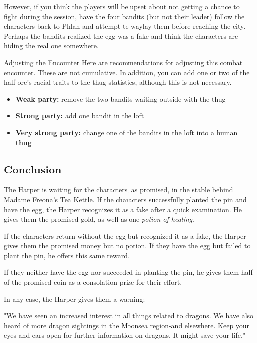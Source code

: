\documentclass[10pt,a4paper,twoside,bg=print,twocolumn,openany,nodeprecatedcode]{dndbook}
\begin{document}
However, if you think the players will be upset about not getting a chance to fight during the session, have the four bandits (but not their leader) follow the characters back to Phlan and attempt to waylay them before reaching the city. Perhaps the bandits realized the egg was a fake and think the characters are hiding the real one somewhere.

\begin{DndSidebar}[float=!b]{Adjusting the Encounter}
Here are recommendations for adjusting this combat encounter. These are not cumulative. In addition, you can add  one or two of the half-orc's racial traits to the thug statistics, although this is not necessary.




\begin{itemize}
\item \textbf{Weak party:} remove the two bandits waiting outside with the thug
\item \textbf{Strong party:} add one bandit in the loft
\item \textbf{Very strong party:} change one of the bandits in the loft into a human \textbf{thug}
\end{itemize}



\end{DndSidebar}

\subsection{Conclusion}
The Harper is waiting for the characters, as promised, in the stable behind Madame Freona's Tea Kettle. If the characters successfully planted the pin and have the egg, the Harper recognizes it as a fake after a quick examination. He gives them the promised gold, as well as one \textit{potion of healing}.

If the characters return without the egg but recognized it as a fake, the Harper gives them the promised money but no potion. If they have the egg but failed to plant the pin, he offers this same reward.

If they neither have the egg nor succeeded in planting the pin, he gives them half of the promised coin as a consolation prize for their effort.

In any case, the Harper gives them a warning:

\begin{DndReadAloud}{}
"We have seen an increased interest in all things related to dragons. We have also heard of more dragon sightings in the Moonsea region-and elsewhere. Keep your eyes and ears open for further information on dragons. It might save your life."

\end{DndReadAloud}
\end{document}
